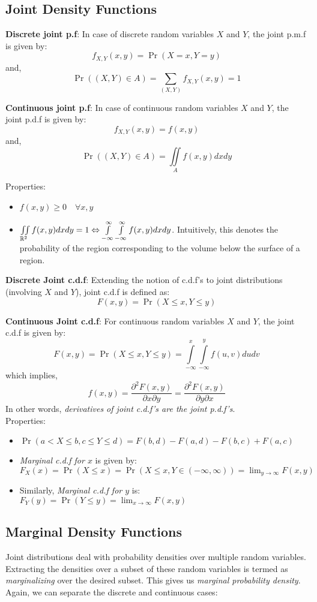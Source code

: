 \documentclass[english, 11pt]{article}
\begin{document}
\subsection{Joint Density Functions}
{\bf Discrete joint p.f}: In case of discrete random variables $X$ and $Y$, the joint p.m.f is given by:
\[ f_{X, Y} (x, y) = \Pr(X=x, Y=y) \]
and,
\[ \Pr((X, Y) \in A) = \sum_{(X, Y)} f_{X, Y} (x, y) = 1 \]

{\bf Continuous joint p.f}: In case of continuous random variables $X$ and $Y$, the joint p.d.f is given by:
\[ f_{X, Y} (x, y) = f(x, y) \]
and,
\[ \Pr((X, Y) \in A) = \iint \limits_{A} f(x, y) dx dy \]

Properties:
\begin{itemize}
\item $f(x, y) \ge 0 \quad \forall x, y$
\item $\iint \limits_{{\mathbb{R}}^2} f(x, y) dx dy = 1 \Leftrightarrow \int\limits_{-\infty}^{\infty} \int\limits_{-\infty}^{\infty} f(x, y) dx dy$. Intuitively, this denotes the probability of the region corresponding to the volume below the surface of a region.
\end{itemize}

{\bf Discrete Joint c.d.f}: Extending the notion of c.d.f's to joint distributions (involving $X$ and $Y$), joint c.d.f is defined as:
\[ F(x, y) = \Pr(X \le x, Y \le y) \]

{\bf Continuous Joint c.d.f}: For continuous random variables $X$ and $Y$, the joint c.d.f is given by:
\[ F(x, y) = \Pr(X \le x, Y \le y) = \int\limits_{-\infty}^{x} \int\limits_{-\infty}^{y} f(u, v) du dv \]
which implies,
\[ f(x, y) = \frac{\partial^2 F(x, y)}{\partial x \partial y}  = \frac{\partial^2 F(x, y)}{\partial y \partial x} \]
In other words, {\it derivatives of joint c.d.f's are the joint p.d.f's}. \\

Properties:
\begin{itemize}
\item $\Pr(a < X \le b, c \le Y \le d) = F(b, d) - F(a, d) - F(b, c) + F(a, c)$
\item {\it Marginal c.d.f for $x$} is given by: $F_X (x) = \Pr(X \le x) = \Pr(X \le x, Y \in (-\infty, \infty)) = \lim_{y \to \infty} F(x, y) $
\item Similarly, {\it Marginal c.d.f for $y$} is: $F_Y(y) = \Pr(Y \le y) = \lim_{x \to \infty} F(x, y) $
\end{itemize}

\subsection{Marginal Density Functions}
Joint distributions deal with probability densities over multiple random variables. Extracting the densities over a subset of these random variables is termed as {\it marginalizing} over the desired subset. This gives us {\it marginal probability density}. Again, we can separate the discrete and continuous cases: \\
\end{document}
